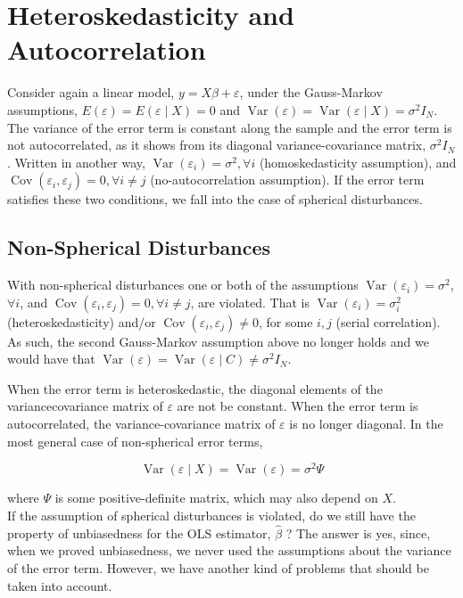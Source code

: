 \section{Heteroskedasticity and Autocorrelation}
Consider again a linear model, $y=X \beta+\varepsilon$, under the Gauss-Markov assumptions, $E(\varepsilon)=E(\varepsilon \mid X)=0$ and $\operatorname{Var}(\varepsilon)=\operatorname{Var}(\varepsilon \mid X)=\sigma^{2} I_{N}$. The variance of the error term is constant along the sample and the error term is not autocorrelated, as it shows from its diagonal variance-covariance matrix, $\sigma^{2} I_{N}$. Written in another way, $\operatorname{Var}\left(\varepsilon_{i}\right)=\sigma^{2}, \forall i$ (homoskedasticity assumption), and $\operatorname{Cov}\left(\varepsilon_{i}, \varepsilon_{j}\right)=0, \forall i \neq j$ (no-autocorrelation assumption). If the error term satisfies these two conditions, we fall into the case of spherical disturbances.

\subsection{Non-Spherical Disturbances}
With non-spherical disturbances one or both of the assumptions $\operatorname{Var}\left(\varepsilon_{i}\right)=\sigma^{2}$, $\forall i$, and $\operatorname{Cov}\left(\varepsilon_{i}, \varepsilon_{j}\right)=0, \forall i \neq j$, are violated. That is $\operatorname{Var}\left(\varepsilon_{i}\right)=\sigma_{i}^{2}$ (heteroskedasticity) and/or $\operatorname{Cov}\left(\varepsilon_{i}, \varepsilon_{j}\right) \neq 0$, for some $i, j$ (serial correlation). As such, the second Gauss-Markov assumption above no longer holds and we would have that $\operatorname{Var}(\varepsilon)=\operatorname{Var}(\varepsilon \mid C) \neq \sigma^{2} I_{N}$.

When the error term is heteroskedastic, the diagonal elements of the variancecovariance matrix of $\varepsilon$ are not be constant. When the error term is autocorrelated, the variance-covariance matrix of $\varepsilon$ is no longer diagonal. In the most general case of non-spherical error terms,

$$
\operatorname{Var}(\varepsilon \mid X)=\operatorname{Var}(\varepsilon)=\sigma^{2} \Psi
$$

where $\Psi$ is some positive-definite matrix, which may also depend on $X$.\\
If the assumption of spherical disturbances is violated, do we still have the property of unbiasedness for the OLS estimator, $\widehat{\beta}$ ? The answer is yes, since, when we proved unbiasedness, we never used the assumptions about the variance of the error term. However, we have another kind of problems that should be taken into account.

